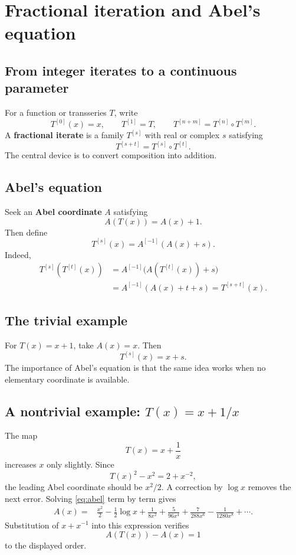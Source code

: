 \documentclass[11pt,openany]{book}
\theoremstyle{plain}
\theoremstyle{definition}
\theoremstyle{remark}
\newcommand{\defterm}[1]{\textbf{#1}}
\begin{document}
\chapter{Fractional iteration and Abel's equation}
\label{chap:iteration}

\section{From integer iterates to a continuous parameter}
For a function or transseries $T$, write
\[
  T^{[0]}(x)=x,
  \qquad
  T^{[1]}=T,
  \qquad
  T^{[n+m]}=T^{[n]}\circ T^{[m]}.
\]
A \defterm{fractional iterate} is a family $T^{[s]}$ with real or complex $s$ satisfying
\[
  T^{[s+t]}=T^{[s]}\circ T^{[t]}.
\]
The central device is to convert composition into addition.

\section{Abel's equation}
Seek an \defterm{Abel coordinate} $A$ satisfying
\[
  A(T(x))=A(x)+1.
  \label{eq:abel}
\]
Then define
\[
  T^{[s]}(x)=A^{[-1]}(A(x)+s).
  \label{eq:fractional-abel}
\]
Indeed,
\begin{align*}
 T^{[s]}(T^{[t]}(x))
 &=A^{[-1]}\bigl(A(T^{[t]}(x))+s\bigr)\\
 &=A^{[-1]}(A(x)+t+s)
 =T^{[s+t]}(x).
\end{align*}

\section{The trivial example}
For $T(x)=x+1$, take $A(x)=x$. Then
\[
  T^{[s]}(x)=x+s.
\]
The importance of Abel's equation is that the same idea works when no elementary coordinate is available.

\section{\texorpdfstring{A nontrivial example: $T(x)=x+1/x$}{A nontrivial example: T(x)=x+1/x}}
The map
\[
  T(x)=x+\frac1x
\]
increases $x$ only slightly. Since
\[
  T(x)^2-x^2=2+x^{-2},
\]
the leading Abel coordinate should be $x^2/2$. A correction by $\log x$ removes the next error. Solving \cref{eq:abel} term by term gives
\begin{align}
 A(x)={}&\frac{x^2}{2}-\frac12\log x
 +\frac{1}{8x^2}+\frac{5}{96x^4}
 +\frac{7}{288x^6}-\frac{1}{1280x^8}+\cdots.
 \label{eq:abel-example}
\end{align}
Substitution of $x+x^{-1}$ into this expression verifies
\[
  A(T(x))-A(x)=1
\]
to the displayed order.
\end{document}
